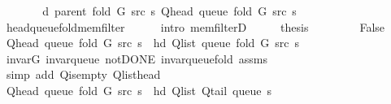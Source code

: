 \begin{isabellebody}
\ \ \isamarkupfalse%
\ \isamarkupfalse%
\ {\isachardoublequoteopen}{\isachardot}{\kern0pt}{\isachardot}{\kern0pt}{\isachardot}{\kern0pt}\ {\isasymle}\ d\ {\isacharparenleft}{\kern0pt}parent\ {\isacharparenleft}{\kern0pt}fold\ G\ src\ s{\isacharparenright}{\kern0pt}{\isacharparenright}{\kern0pt}\ {\isacharparenleft}{\kern0pt}Q{\isacharunderscore}{\kern0pt}head\ {\isacharparenleft}{\kern0pt}queue\ {\isacharparenleft}{\kern0pt}fold\ G\ src\ s{\isacharparenright}{\kern0pt}{\isacharparenright}{\kern0pt}{\isacharparenright}{\kern0pt}{\isachardoublequoteclose}\isanewline
\ \ \ \ \isamarkupfalse%
\ head{\isacharunderscore}{\kern0pt}queue{\isacharunderscore}{\kern0pt}fold{\isacharunderscore}{\kern0pt}mem{\isacharunderscore}{\kern0pt}filter\isanewline
\ \ \ \ \isamarkupfalse%
\ {\isacharparenleft}{\kern0pt}intro\ mem{\isacharunderscore}{\kern0pt}filterD{\isacharparenleft}{\kern0pt}{}{\isacharparenright}{\kern0pt}{\isacharparenright}{\kern0pt}\isanewline
\ \ \isamarkupfalse%
\ \isamarkupfalse%
\ {\isacharquery}{\kern0pt}thesis\isanewline
\ \ \ \ \isacommand{{\isachardot}{\kern0pt}}\isamarkupfalse%
\isanewline
{}\isamarkupfalse%
\isanewline
\ \ \isamarkupfalse%
\ False\isanewline
\ \ \isamarkupfalse%
\ {\isachardoublequoteopen}Q{\isacharunderscore}{\kern0pt}head\ {\isacharparenleft}{\kern0pt}queue\ {\isacharparenleft}{\kern0pt}fold\ G\ src\ s{\isacharparenright}{\kern0pt}{\isacharparenright}{\kern0pt}\ {\isacharequal}{\kern0pt}\ hd\ {\isacharparenleft}{\kern0pt}Q{\isacharunderscore}{\kern0pt}list\ {\isacharparenleft}{\kern0pt}queue\ {\isacharparenleft}{\kern0pt}fold\ G\ src\ s{\isacharparenright}{\kern0pt}{\isacharparenright}{\kern0pt}{\isacharparenright}{\kern0pt}{\isachardoublequoteclose}\isanewline
\ \ \ \ \isamarkupfalse%
\ invar{\isacharunderscore}{\kern0pt}G\ invar{\isacharunderscore}{\kern0pt}queue\ not{\isacharunderscore}{\kern0pt}DONE\ invar{\isacharunderscore}{\kern0pt}queue{\isacharunderscore}{\kern0pt}fold{\isacharunderscore}{\kern0pt}{}\ assms\isanewline
\ \ \ \ \isamarkupfalse%
\ {\isacharparenleft}{\kern0pt}simp\ add{\isacharcolon}{\kern0pt}\ Q{\isachardot}{\kern0pt}is{\isacharunderscore}{\kern0pt}empty\ Q{\isachardot}{\kern0pt}list{\isacharunderscore}{\kern0pt}head{\isacharparenright}{\kern0pt}\isanewline
\ \ \isamarkupfalse%
\ {\isachardoublequoteopen}Q{\isacharunderscore}{\kern0pt}head\ {\isacharparenleft}{\kern0pt}queue\ {\isacharparenleft}{\kern0pt}fold\ G\ src\ s{\isacharparenright}{\kern0pt}{\isacharparenright}{\kern0pt}\ {\isacharequal}{\kern0pt}\ hd\ {\isacharparenleft}{\kern0pt}Q{\isacharunderscore}{\kern0pt}list\ {\isacharparenleft}{\kern0pt}Q{\isacharunderscore}{\kern0pt}tail\ {\isacharparenleft}{\kern0pt}queue\ s{\isacharparenright}{\kern0pt}{\isacharparenright}{\kern0pt}{\isacharparenright}{\kern0pt}{\isachardoublequoteclose}\isanewline

\end{isabellebody}

